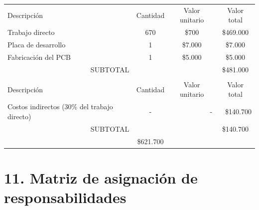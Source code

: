 \documentclass[
11pt, %
]{charter}
\begin{document}
\begin{table}[htpb]
\centering
\begin{tabularx}{\linewidth}{@{}|X|c|r|r|@{}}
\hline
\rowcolor[HTML]{C0C0C0} 
\multicolumn{4}{|c|}{\cellcolor[HTML]{C0C0C0}COSTOS DIRECTOS} \\ \hline
\rowcolor[HTML]{C0C0C0} 
Descripción &
  \multicolumn{1}{c|}{\cellcolor[HTML]{C0C0C0}Cantidad} &
  \multicolumn{1}{c|}{\cellcolor[HTML]{C0C0C0}Valor unitario} &
  \multicolumn{1}{c|}{\cellcolor[HTML]{C0C0C0}Valor total} \\ \hline
 Trabajo directo &
  \multicolumn{1}{c|}{670} &
  \multicolumn{1}{c|}{\$700} &
  \multicolumn{1}{c|}{\$469.000} \\ \hline
 Placa de desarrollo &
  \multicolumn{1}{c|}{1} &
  \multicolumn{1}{c|}{\$7.000} &
  \multicolumn{1}{c|}{\$7.000} \\ \hline
 Fabricación del PCB &
  \multicolumn{1}{c|}{1} &
  \multicolumn{1}{c|}{\$5.000} &
  \multicolumn{1}{c|}{\$5.000} \\ \hline
\multicolumn{3}{|c|}{SUBTOTAL} &
  \multicolumn{1}{c|}{\$481.000} \\ \hline
\rowcolor[HTML]{C0C0C0} 
\multicolumn{4}{|c|}{\cellcolor[HTML]{C0C0C0}COSTOS INDIRECTOS} \\ \hline
\rowcolor[HTML]{C0C0C0} 
Descripción &
  \multicolumn{1}{c|}{\cellcolor[HTML]{C0C0C0}Cantidad} &
  \multicolumn{1}{c|}{\cellcolor[HTML]{C0C0C0}Valor unitario} &
  \multicolumn{1}{c|}{\cellcolor[HTML]{C0C0C0}Valor total} \\ \hline
\multicolumn{1}{|l|}{Costos indirectos (30\% del trabajo directo)} &
   - &
   - &
   \$140.700\\ \hline

\multicolumn{3}{|c|}{SUBTOTAL} &
  \multicolumn{1}{c|}{\$140.700} \\ \hline
\rowcolor[HTML]{C0C0C0}
\multicolumn{3}{|c|}{TOTAL} &
   \$621.700\\ \hline
\end{tabularx}%
\end{table}


\section{11. Matriz de asignación de responsabilidades}
\label{sec:responsabilidades}
\end{document}
